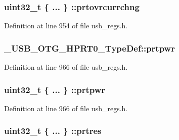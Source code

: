 \hypertarget{group___u_s_b___o_t_g___d_r_i_v_e_r_ga9e0be0ab3aa126548ef77704b2cb9d8f}{
\subsubsection[{prtovrcurrchng}]{\setlength{\rightskip}{0pt plus 5cm}uint32\-\_\-t \{ ... \} \-::prtovrcurrchng}}\label{group___u_s_b___o_t_g___d_r_i_v_e_r_ga9e0be0ab3aa126548ef77704b2cb9d8f}


Definition at line 954 of file usb\-\_\-regs.\-h.

\hypertarget{group___u_s_b___o_t_g___d_r_i_v_e_r_gab6199aadb1043eb15c2814bf6985fefb}{
\subsubsection[{prtpwr}]{ \-\_\-\-U\-S\-B\-\_\-\-O\-T\-G\-\_\-\-H\-P\-R\-T0\-\_\-\-Type\-Def\-::prtpwr}}\label{group___u_s_b___o_t_g___d_r_i_v_e_r_gab6199aadb1043eb15c2814bf6985fefb}


Definition at line 966 of file usb\-\_\-regs.\-h.

\hypertarget{group___u_s_b___o_t_g___d_r_i_v_e_r_gabf32d0e9f44b94bbf1f498375bb0596d}{
\subsubsection[{prtpwr}]{\setlength{\rightskip}{0pt plus 5cm}uint32\-\_\-t \{ ... \} \-::prtpwr}}\label{group___u_s_b___o_t_g___d_r_i_v_e_r_gabf32d0e9f44b94bbf1f498375bb0596d}


Definition at line 966 of file usb\-\_\-regs.\-h.

\hypertarget{group___u_s_b___o_t_g___d_r_i_v_e_r_gaff07e87ea104fef953669989b974f694}{
\subsubsection[{prtres}]{\setlength{\rightskip}{0pt plus 5cm}uint32\-\_\-t \{ ... \} \-::prtres}}\label{group___u_s_b___o_t_g___d_r_i_v_e_r_gaff07e87ea104fef953669989b974f694}


